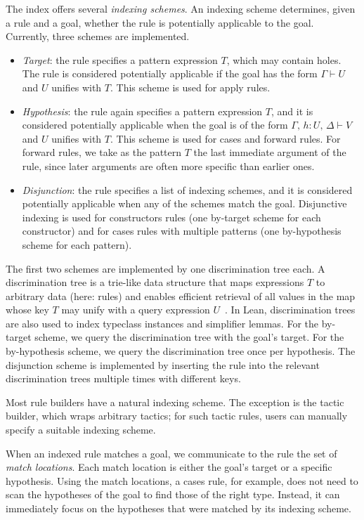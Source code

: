The index offers several \emph{indexing schemes}. An indexing scheme determines, given a rule and a goal, whether the rule is potentially applicable to the goal.
Currently, three schemes are implemented.
\begin{itemize}
  \item
    \emph{Target}: the rule specifies a pattern expression $T$, which may contain holes.
    The rule is considered potentially applicable if the goal has the form $Γ ⊢ U$ and $U$ unifies with $T$.
    This scheme is used for apply rules.
  \item
    \emph{Hypothesis}: the rule again specifies a pattern expression $T$, and it is considered potentially applicable when the goal is of the form $Γ,\, h : U,\, Δ ⊢ V$ and $U$ unifies with $T$.
    This scheme is used for cases and forward rules.
    For forward rules, we take as the pattern $T$ the last immediate argument of the rule, since later arguments are often more specific than earlier ones.
  \item
    \emph{Disjunction}: the rule specifies a list of indexing schemes, and it is considered potentially applicable when any of the schemes match the goal.
    Disjunctive indexing is used for constructors rules (one by-target scheme for each constructor) and for cases rules with multiple patterns (one by-hypothesis scheme for each pattern).
\end{itemize}

The first two schemes are implemented by one discrimination tree each.
A discrimination tree is a trie-like data structure that maps expressions $T$ to arbitrary data (here: rules) and enables efficient retrieval of all values in the map whose key $T$ may unify with a query expression
$U$~\cite{DiscriminationTrees}.
In Lean, discrimination trees are also used to index typeclass instances and simplifier lemmas.
For the by-target scheme, we query the discrimination tree with the goal's target.
For the by-hypothesis scheme, we query the discrimination tree once per hypothesis.
The disjunction scheme is implemented by inserting the rule into the relevant discrimination trees multiple times with different keys.

Most rule builders have a natural indexing scheme.
The exception is the tactic builder, which wraps arbitrary tactics; for such tactic rules, users can manually specify a suitable indexing scheme.

When an indexed rule matches a goal, we communicate to the rule the set of \emph{match locations}.
Each match location is either the goal's target or a specific hypothesis.
Using the match locations, a cases rule, for example, does not need to scan the hypotheses of the goal to find those of the right type.
Instead, it can immediately focus on the hypotheses that were matched by its indexing scheme.


